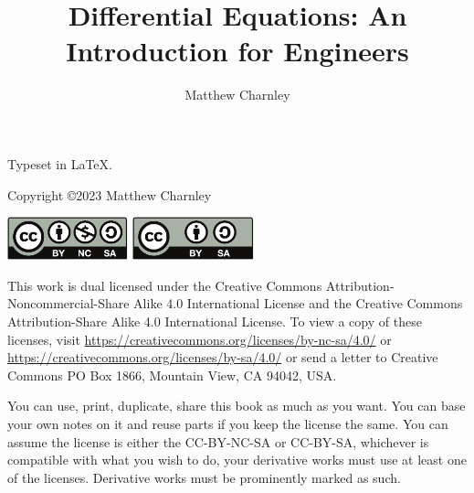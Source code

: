\documentclass[12pt]{book}
\author{Matthew Charnley}
\title{Differential Equations: An Introduction for Engineers}
\begin{document}
\newcommand{\theversion}{0.99}
\myTitlePage

\newpage

\vspace*{\fill}

\begin{small}
\noindent
Typeset in \LaTeX.

\bigskip

\noindent
Copyright \copyright 2023 Matthew Charnley



\bigskip

\noindent
\includegraphics[width=1.38in]{figures/license}
\quad
\includegraphics[width=1.38in]{figures/license2}

\bigskip

\noindent
This work
is dual licensed under
the Creative Commons
Attribution-Non\-commercial-Share Alike 4.0 International License and
the Creative Commons
Attribution-Share Alike 4.0 International License.
To view a
copy of these licenses, visit
\url{https://creativecommons.org/licenses/by-nc-sa/4.0/}
or
\url{https://creativecommons.org/licenses/by-sa/4.0/}
or send a letter to
Creative Commons
PO Box 1866, Mountain View, CA 94042, USA\@.

\bigskip

\noindent
You can use, print, duplicate, share this book as much as you want.  You can
base your own notes on it and reuse parts if you keep the license the
same.  You can assume the license is either the
CC-BY-NC-SA or CC-BY-SA\@,
whichever is compatible with what you wish to do, your derivative works must
use at least one of the licenses.
Derivative works must be prominently marked as such.


\end{small}
\end{document}
